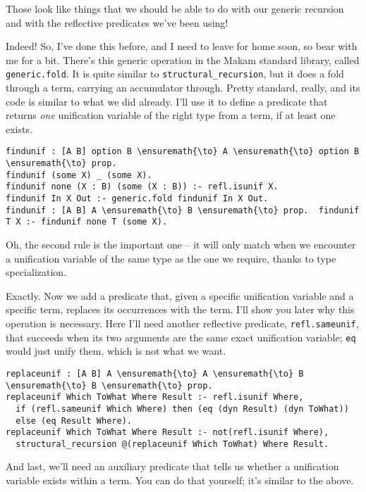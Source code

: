 \noindent
Those look like things that we should be able to do with our generic
recursion and with the reflective predicates we've been using!

\heroADVISOR{} Indeed! So, I've done this before, and I need to leave for home
soon, so bear with me for a bit. There's this generic operation in the
Makam standard library, called \texttt{generic.fold}. It is quite
similar to \texttt{structural\_recursion}, but it does a fold through a
term, carrying an accumulator through. Pretty standard, really, and its
code is similar to what we did already. I'll use it to define a
predicate that returns \emph{one} unification variable of the right type
from a term, if at least one exists.

\begin{verbatim}
findunif : [A B] option B \ensuremath{\to} A \ensuremath{\to} option B \ensuremath{\to} prop.
findunif (some X) _ (some X).
findunif none (X : B) (some (X : B)) :- refl.isunif X.
findunif In X Out :- generic.fold findunif In X Out.
findunif : [A B] A \ensuremath{\to} B \ensuremath{\to} prop.  findunif T X :- findunif none T (some X).
\end{verbatim}

\heroSTUDENT{} Oh, the second rule is the important one -- it will only match
when we encounter a unification variable of the same type as the one we
require, thanks to type specialization.

\heroADVISOR{} Exactly. Now we add a predicate that, given a specific
unification variable and a specific term, replaces its occurrences with
the term. I'll show you later why this operation is necessary. Here I'll
need another reflective predicate, \texttt{refl.sameunif}, that succeeds
when its two arguments are the same exact unification variable;
\texttt{eq} would just unify them, which is not what we want.

\begin{verbatim}
replaceunif : [A B] A \ensuremath{\to} A \ensuremath{\to} B \ensuremath{\to} B \ensuremath{\to} prop.
replaceunif Which ToWhat Where Result :- refl.isunif Where,
  if (refl.sameunif Which Where) then (eq (dyn Result) (dyn ToWhat))
  else (eq Result Where).
replaceunif Which ToWhat Where Result :- not(refl.isunif Where),
  structural_recursion @(replaceunif Which ToWhat) Where Result.
\end{verbatim}

\heroADVISOR{} And last, we'll need an auxiliary predicate that tells us
whether a unification variable exists within a term. You can do that
yourself; it's similar to the above.

